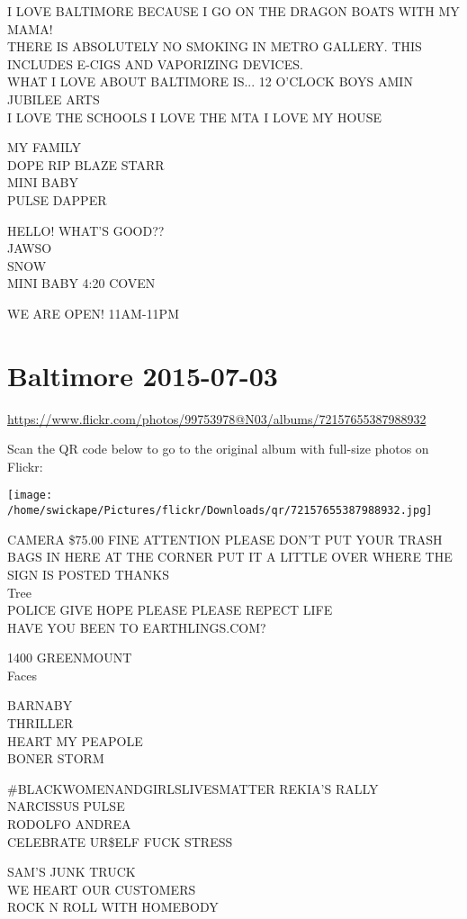 \documentclass[10pt,letterpaper]{article}
\begin{document}
I LOVE BALTIMORE BECAUSE I GO ON THE DRAGON BOATS WITH MY MAMA!\\
THERE IS ABSOLUTELY NO SMOKING IN METRO GALLERY.  THIS INCLUDES E{-}CIGS AND VAPORIZING DEVICES.\\
WHAT I LOVE ABOUT BALTIMORE IS... 12 O'CLOCK BOYS AMIN JUBILEE ARTS\\
I LOVE THE SCHOOLS I LOVE THE MTA I LOVE MY HOUSE

MY FAMILY\\
DOPE RIP BLAZE STARR\\
MINI BABY\\
PULSE DAPPER

HELLO!  WHAT'S GOOD??\\
JAWSO\\
SNOW\\
MINI BABY 4:20 COVEN

WE ARE OPEN!  11AM{-}11PM


\section*{Baltimore 2015-07-03}

\url{https://www.flickr.com/photos/99753978@N03/albums/72157655387988932}

Scan the QR code below to go to the original album with full-size photos on Flickr:

\texttt{[image: /home/swickape/Pictures/flickr/Downloads/qr/72157655387988932.jpg]}


CAMERA \$75.00 FINE ATTENTION PLEASE DON'T PUT YOUR TRASH BAGS IN HERE AT THE CORNER PUT IT A LITTLE OVER WHERE THE SIGN IS POSTED THANKS\\
Tree\\
POLICE GIVE HOPE PLEASE PLEASE REPECT LIFE\\
HAVE YOU BEEN TO EARTHLINGS.COM?

1400 GREENMOUNT\\
Faces

BARNABY\\
THRILLER\\
HEART MY PEAPOLE\\
BONER STORM

\#BLACKWOMENANDGIRLSLIVESMATTER REKIA'S RALLY\\
NARCISSUS PULSE\\
RODOLFO ANDREA\\
CELEBRATE UR\$ELF FUCK STRESS

SAM'S JUNK TRUCK\\
WE HEART OUR CUSTOMERS\\
ROCK N ROLL WITH HOMEBODY
\end{document}
